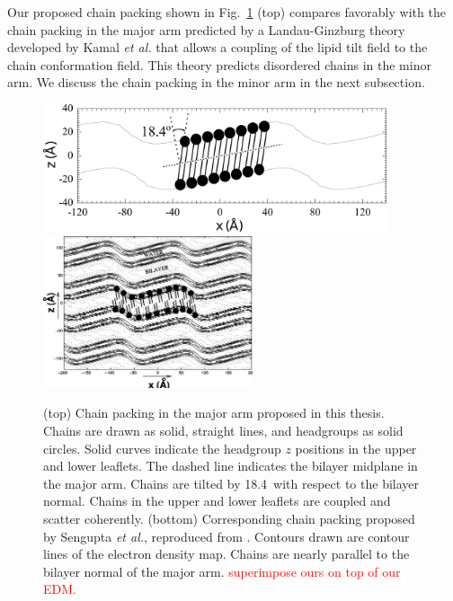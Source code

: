 Our proposed chain packing shown in Fig.~\ref{fig:major-arm_cartoon} (top)
compares favorably with the chain packing in the major arm predicted by
a Landau-Ginzburg theory developed by Kamal \textit{et al.} 
that allows a coupling of the lipid tilt field to the chain conformation field.
This theory predicts disordered chains in the minor arm. We discuss
the chain packing in the minor arm in the next subsection.

\begin{figure}
  \centering
  \includegraphics[width=0.9\textwidth]{figures/ripple/discussion/major-arm_cartoon}
  \includegraphics[trim=300 450 200 300,clip=true,width=0.55\textwidth]{figures/ripple/discussion/Sengupta_cartoon}  
  \caption[Chain packing in the major arm proposed in this thesis]
  {(top) Chain packing in the major arm proposed in this thesis.
  Chains are drawn as solid, straight lines, and headgroups as solid circles.
  Solid curves indicate the headgroup $z$ positions in the upper and 
  lower leaflets.
  The dashed line indicates the bilayer midplane in the major arm.
  Chains are tilted by 18.4\textdegree\ with respect to the bilayer normal. 
  Chains in the upper and lower leaflets are coupled and scatter coherently. 
  (bottom) Corresponding chain packing proposed by
  Sengupta \textit{et al.}, reproduced from \cite{ref:Sengupta03}. 
  Contours drawn are contour lines of the electron density map.
  Chains are nearly parallel to the bilayer normal of the major arm.
  \textcolor{red}{superimpose ours on top of our EDM.}
  }
  \label{fig:major-arm_cartoon}
\end{figure}

